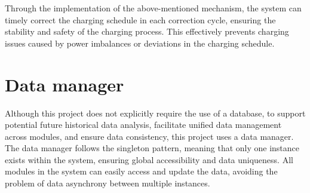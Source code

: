 \documentclass[
	english,
	ruledheaders=section,%
	class=report,%
	thesis={type=Report},%
	accentcolor=9c,%
	custommargins=true,%
	marginpar=false,%
	parskip=half-,%
	fontsize=11pt,%
	logofile={img/tuda_logo.pdf}, %
]{tudapub}
\begin{document}



Through the implementation of the above-mentioned mechanism, the system can timely correct the charging schedule in each correction cycle, ensuring the stability and safety of the charging process. This effectively prevents charging issues caused by power imbalances or deviations in the charging schedule.


\section{Data manager}
Although this project does not explicitly require the use of a database, to support potential future historical data analysis, facilitate unified data management across modules, and ensure data consistency, this project uses a data manager. The data manager follows the singleton pattern, meaning that only one instance exists within the system, ensuring global accessibility and data uniqueness. All modules in the system can easily access and update the data, avoiding the problem of data asynchrony between multiple instances.
\end{document}
